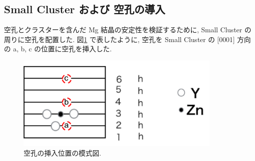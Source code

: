 \subsection{ Small Cluster および 空孔の導入}
空孔とクラスターを含んだ Mg 結晶の安定性を検証するために, Small Cluster の周りに空孔を配置した. 図\ref{fig2.4} で表したように, 空孔を Small Cluster の [0001] 方向の a, b, c の位置に空孔を挿入した.

\begin{figure}[htbp]
	\begin{center}
		\includegraphics[width=100mm]{../method/vacancyposition.png}
		\caption{空孔の挿入位置の模式図.}
		\label{fig2.4}
	\end{center}
\end{figure}



